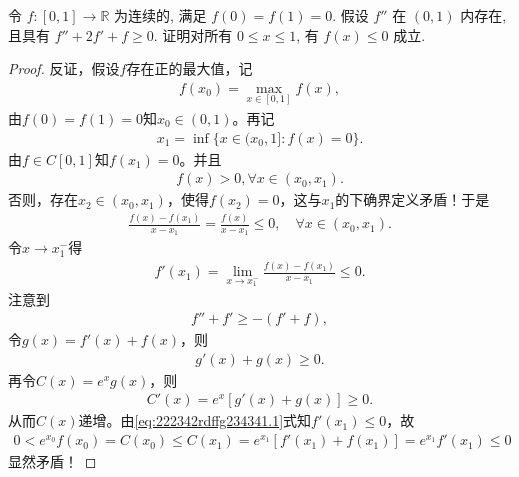\documentclass[../../main.tex]{subfiles}
\begin{document}
\begin{example}
令 $f:[0,1] \to \mathbb{R}$ 为连续的, 满足 $f(0) = f(1) = 0$. 假设 $f''$ 在 $(0,1)$ 内存在, 且具有 $f''+2f'+f \geqslant 0$. 证明对所有 $0 \leqslant x \leqslant 1$, 有 $f(x) \leqslant 0$ 成立.
\end{example}
\begin{proof}
反证，假设$f$存在正的最大值，记
\begin{align*}
f(x_0) = \max_{x \in [0,1]} f(x),
\end{align*}
由$f(0) = f(1) = 0$知$x_0 \in (0,1)$。再记
\begin{align*}
x_1 = \inf \{ x \in (x_0,1] : f(x) = 0 \}.
\end{align*}
由$f \in C[0,1]$知$f(x_1) = 0$。并且
\begin{align*}
f(x) > 0, \forall x \in (x_0, x_1).
\end{align*}
否则，存在$x_2 \in (x_0, x_1)$，使得$f(x_2) = 0$，这与$x_1$的下确界定义矛盾！于是
\begin{align*}
\frac{f(x) - f(x_1)}{x - x_1} = \frac{f(x)}{x - x_1} \leqslant 0, \quad \forall x \in (x_0, x_1).
\end{align*}
令$x \to x_1^-$得
\begin{align}
f'(x_1) = \lim_{x \to x_1^-} \frac{f(x) - f(x_1)}{x - x_1} \leqslant 0. \label{eq:222342rdffg234341.1}
\end{align}
注意到
\begin{align*}
f'' + f' \geqslant -(f' + f),
\end{align*}
令$g(x) = f'(x) + f(x)$，则
\begin{align*}
g'(x) + g(x) \geqslant 0.
\end{align*}
再令$C(x) = e^x g(x)$，则
\begin{align*}
C'(x) = e^x [g'(x) + g(x)] \geqslant 0.
\end{align*}
从而$C(x)$递增。由\eqref{eq:222342rdffg234341.1}式知$f'(x_1) \leqslant 0$，故
\begin{align*}
0 < e^{x_0} f(x_0) = C(x_0) \leqslant C(x_1) = e^{x_1} [f'(x_1) + f(x_1)] = e^{x_1} f'(x_1) \leqslant 0
\end{align*}
显然矛盾！

\end{proof}
\end{document}
